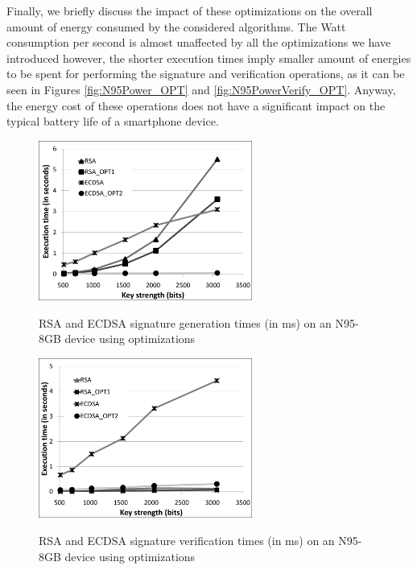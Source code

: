 \documentclass[authoryear]{elsarticle}
\begin{document}
Finally, we briefly discuss the impact of these optimizations on the overall amount of energy consumed by the considered algorithms. The Watt consumption per second is almost unaffected by all the optimizations we have introduced however, the shorter execution times imply smaller amount of energies to be spent for performing the signature and verification operations, as it can be seen in Figures \ref{fig:N95Power_OPT} and \ref{fig:N95PowerVerify_OPT}. Anyway, the energy cost of these operations does not have a significant impact on the typical battery life of a smartphone device. 


 \begin{figure}[h]
\begin{center}
  \includegraphics[width=7cm]{immagini/Firme_OPT1_OPT2.pdf}\\
  \caption{RSA and ECDSA signature generation times (in ms) on an N95-8GB device using optimizations}
  \label{fig:Firme_OPT1_OPT2}
\end{center}
\end{figure}

\begin{figure}[h]
\begin{center}
  \includegraphics[width=7cm]{immagini/Verifiche_OPT1_OPT2.pdf}\\
  \caption{RSA and ECDSA signature verification times (in ms) on an N95-8GB device using optimizations}
  \label{fig:Verifiche_OPT1_OPT2}
\end{center}
\end{figure}
\end{document}

